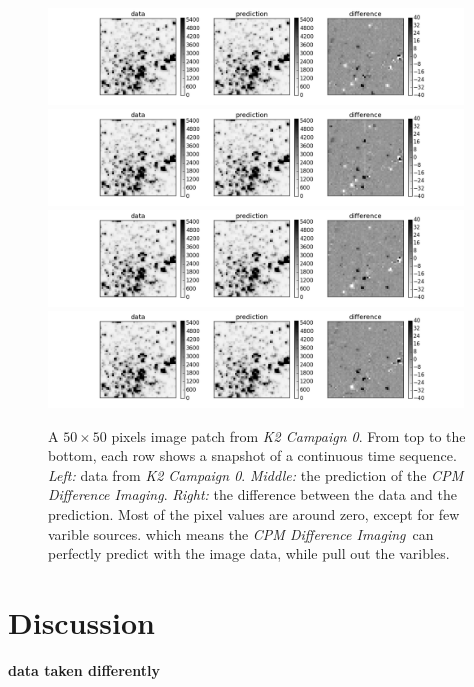 \documentclass[12pt, preprint]{aastex}
\newcommand{\project}[1]{\textsl{#1}}
\newcommand{\cpmdiff}{\project{CPM Difference Imaging}}
\newcommand{\KTCZ}{\project{K2 Campaign 0}}
\newcommand{\todo}[1]{\textbf{#1}}
\begin{document}
\begin{figure}[p]
\begin{center}
\includegraphics[width=0.98\textwidth]{f2a}
\includegraphics[width=0.98\textwidth]{f2b}
\includegraphics[width=0.98\textwidth]{f2c}
\includegraphics[width=0.98\textwidth]{f2d}

\end{center}
\caption{
  \label{images} 
  A $50\times50$ pixels image patch from \KTCZ. From top to the bottom,  each row shows a snapshot of a continuous time sequence.
  \emph{Left:} data from \KTCZ.
  \emph{Middle:} the prediction of the \cpmdiff.
  \emph{Right:} the difference between the data and the prediction. Most of the pixel values are around zero, except for few varible sources. which means the \cpmdiff\ can perfectly predict with the image data, while pull out the varibles.
}
\end{figure}

\section{Discussion}
\todo{data taken differently}

\clearpage

\clearpage
\end{document}
